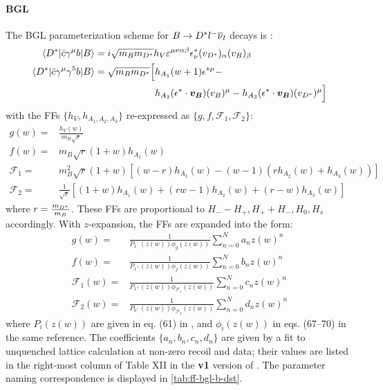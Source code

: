 \paragraph{BGL}
The BGL parameterization scheme for $B \rightarrow {\ensuremath{{D}^*}}{\ensuremath{l^-}}{\ensuremath{{\overline{\nu}}_l}}$ decays is
\cite{Bazavov_2021}:
\begin{align}
    \bra{\Dstar} \bar{c} \gamma^\mu b \ket{B}
    =\hphantom{ } &
        i\sqrt{m_B m_\Dstar} h_V \varepsilon^{\mu\nu\alpha\beta}
        \epsilon^*_\nu (v_\Dstar)_\alpha (v_B)_\beta \\
    \bra{\Dstar} \bar{c} \gamma^\mu \gamma^5 b \ket{B}
    =\hphantom{ } &
        \sqrt{m_B m_\Dstar} \Big[
            h_{A_1}(w+1) \epsilon^{*\mu} -
    \nonumber \\
    &\hphantom{\sqrt{m_B m_\Dstar} \Big[}
            h_{A_2} (\epsilon^* \cdot \vec{v_B}) (v_B)^\mu -
            h_{A_3} (\epsilon^* \cdot \vec{v_B}) (v_\Dstar)^\mu
        \Big]
\end{align}
with the FFs $\{h_V,h_{A_1,A_2,A_3}\}$ re-expressed as
$\{g,f,\mathcal{F}_1,\mathcal{F}_2\}$:
\begin{align}
    g(w) =& \frac{h_V(w)}{m_B \sqrt{r}} \\
    f(w) =& m_B \sqrt{r}(1 + w) h_{A_1}(w) \\
    \mathcal{F}_1 =& m^2_B \sqrt{r}(1+w)\left[
        (w - r) h_{A_1}(w) - (w - 1)(r h_{A_2}(w) + h_{A_3}(w))
    \right] \\
    \mathcal{F}_2 =& \frac{1}{\sqrt{r}} \left[
        (1+w)h_{A_1}(w) + (rw - 1) h_{A_2}(w) + (r-w)h_{A_3}(w)
    \right]
\end{align}
where $r = \frac{m_{{D}^*}}{m_B}$.
These FFs are proportional to $H_- - H_+, H_+ + H_-, H_0, H_s$ accordingly.
With $z$-expansion, the FFs are expanded into the form:
\begin{align}
    g(w) =& \frac{1}{P_{1^-}(z(w))\phi_g(z(w))}
        \sum^N_{n = 0} a_n z(w)^n \\
    f(w) =& \frac{1}{P_{1^+}(z(w))\phi_f(z(w))}
        \sum^N_{n = 0} b_n z(w)^n \\
    \mathcal{F}_1(w) =& \frac{1}{P_{1^+}(z(w))\phi_{\mathcal{F}_1}(z(w))}
        \sum^N_{n = 0} c_n z(w)^n \\
    \mathcal{F}_2(w) =& \frac{1}{P_{0^-}(z(w))\phi_{\mathcal{F}_2}(z(w))}
        \sum^N_{n = 0} d_n z(w)^n
\end{align}
where $P_i(z(w))$ are given in eq. (61) in \cite{Bazavov_2021}, and
$\phi_i(z(w))$ in eqs. (67--70) in the same reference.
The coefficients $\{a_n, b_n, c_n, d_n\}$ are given by a fit to unquenched
lattice calculation at non-zero recoil and data;
their values are listed in the right-most column of Table XII in the
\textbf{v1} version of \cite{Bazavov_2021}.
The parameter naming correspondence is displayed in
\cref{tab:ff-bgl-b-dst}.

